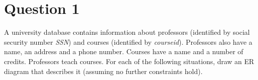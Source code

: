 
\section*{Question 1}

A university database contains information about professors (identified by social security number \textit{SSN}) and courses (identified by \textit{courseid}).
Professors also have a name, an address and a phone number.
Courses have a name and a number of credits.
Professors teach courses.
For each of the following situations, draw an ER diagram that describes it (assuming no further constraints hold).

